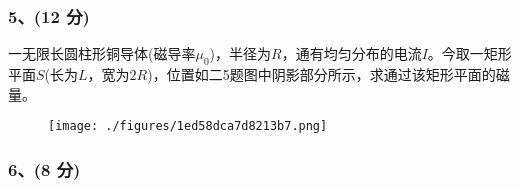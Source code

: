 \subsubsection{5、(12 分)}
一无限长圆柱形铜导体(磁导率$\mu_0$)，半径为$R$，通有均匀分布的电流$I$。今取一矩形平面$S$(长为$L$，宽为$2R$)，位置如二5题图中阴影部分所示，求通过该矩形平面的磁量。
\begin{figure}[ht]
\centering
\texttt{[image: ./figures/1ed58dca7d8213b7.png]}
\caption{} \label{fig_CD13_5}
\end{figure}
\subsubsection{6、(8 分)}